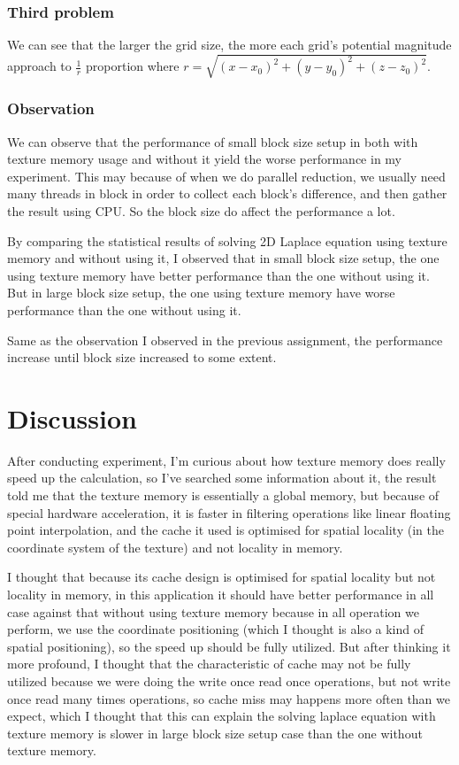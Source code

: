 \documentclass{article}
\begin{document}
	\subsubsection{Third problem}
	We can see that the larger the grid size, the more each grid's potential magnitude approach to $\frac{1}{r}$ proportion where $r=\sqrt{(x-x_0)^2+(y-y_0)^2+(z-z_0)^2}$.

	\subsubsection{Observation}
	We can observe that the performance of small block size setup in both with texture memory usage and without it yield the worse performance in my experiment. This may because of when we do parallel reduction, we usually need many threads in block in order to collect each block's difference, and then gather the result using CPU. So the block size do affect the performance a lot.
	
	By comparing the statistical results of solving 2D Laplace equation using texture memory and without using it, I observed that in small block size setup, the one using texture memory have better performance than the one without using it. But in large block size setup, the one using texture memory have worse performance than the one without using it. 
	
	Same as the observation I observed in the previous assignment, the performance increase until block size increased to some extent. 
	
	\section{Discussion}
	After conducting experiment, I'm curious about how texture memory does really speed up the calculation, so I've searched some information about it, the result told me that the texture memory is essentially a global memory, but because of special hardware acceleration, it is faster in filtering operations like linear floating point interpolation, and the cache it used is optimised for spatial locality (in the coordinate system of the texture) and not locality in memory.
	
	I thought that because its cache design is optimised for spatial locality but not locality in memory, in this application it should have better performance in all case against that without using texture memory because in all operation we perform, we use the coordinate positioning (which I thought is also a kind of spatial positioning), so the speed up should be fully utilized. But after thinking it more profound, I thought that the characteristic of cache may not be fully utilized because we were doing the write once read once operations, but not write once read many times operations, so cache miss may happens more often than we expect, which I thought that this can explain the solving laplace equation with texture memory is slower in large block size setup case than the one without texture memory.
	
\end{document}

